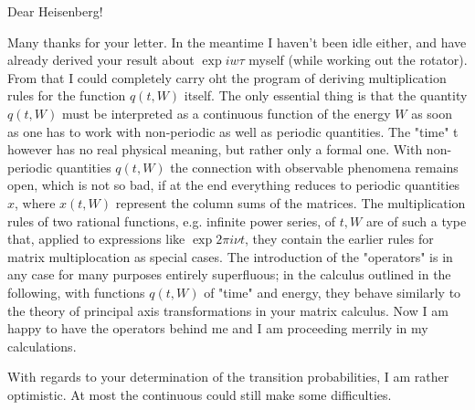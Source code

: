\date{January 31, 1926}

Dear Heisenberg!

Many thanks for your letter. In the meantime I haven't been idle either, and have already derived your result about $\exp{iw\tau}$ myself (while working out the rotator). From that I could completely carry oht the program of deriving multiplication rules for the function $q(t, W)$ itself. The only essential thing is that the quantity $q(t, W)$ must be interpreted as a continuous function of the energy $W$ as soon as one has to work with non-periodic as well as periodic quantities. The "time" t however has no real physical meaning, but rather only a formal one. With non-periodic quantities $q(t, W)$ the connection with observable phenomena remains open, which is not so bad, if at the end everything reduces to periodic quantities $x$, where $x(t, W)$ represent the column sums of the matrices. The multiplication rules of two rational functions, e.g. infinite power series, of $t, W$ are of such a type that, applied to expressions like $\exp{2\pi i\nu t}$, they contain the earlier rules for matrix multiplocation as special cases. The introduction of the "operators" is in any case for many purposes entirely superfluous; in the calculus outlined in the following, with functions $q(t, W)$ of "time" and energy, they behave similarly to the theory of principal axis transformations in your matrix calculus. Now I am happy to have the operators behind me and I am proceeding merrily in my calculations.

With regards to your determination of the transition probabilities, I am rather optimistic. At most the continuous  could still make some difficulties.

